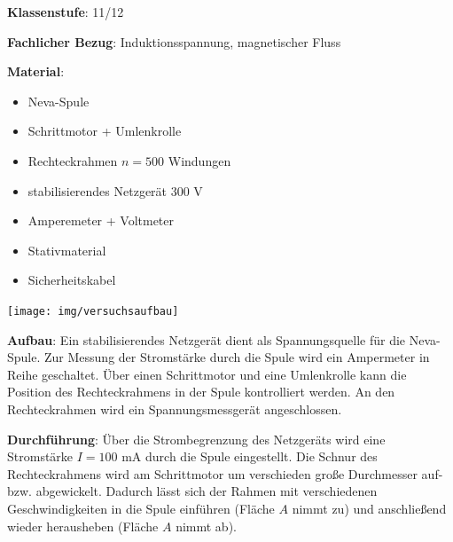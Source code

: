 \documentclass[../main.tex]{subfiles}
\begin{document}
\begin{tcolorbox}[
    width=\textwidth,
    height=\textheight,
    title=Versuch: Induktion bei Flächenänderung,
    fonttitle=\Large,
    before title=\vspace{0.2cm}, after title=\vspace{0.2cm},
    colback=white,
    title filled=true, 
    colbacktitle=mygray,
    colframe=black,
    coltitle=black,
    ]

    \vspace{0.2cm}
    \textbf{Klassenstufe}: 11/12

    \vspace{0.4cm}

    \textbf{Fachlicher Bezug}: Induktionsspannung, magnetischer Fluss
    \vspace{0.4cm}

    \begin{minipage}[c]{0.52\textwidth}
        \textbf{Material}:
        \vspace{-0.2cm}
        \begin{itemize}[noitemsep]
            \item Neva-Spule
            \item Schrittmotor + Umlenkrolle
            \item Rechteckrahmen $n=500$ Windungen
            \item stabilisierendes Netzgerät 300 V 
            \item Amperemeter + Voltmeter
            \item Stativmaterial
            \item Sicherheitskabel
        \end{itemize}
    \end{minipage}
    \hspace{0.3cm}
    \begin{minipage}[c]{0.48\textwidth}
        \centering
        \texttt{[image: img/versuchsaufbau]}
    \end{minipage}

    \vspace{0.5cm}
    \textbf{Aufbau}: Ein stabilisierendes Netzgerät dient als Spannungsquelle für die Neva-Spule. Zur Messung der Stromstärke durch die Spule wird ein Ampermeter in Reihe geschaltet. Über einen Schrittmotor und eine Umlenkrolle kann die Position des Rechteckrahmens in der Spule kontrolliert werden. An den Rechteckrahmen wird ein Spannungsmessgerät angeschlossen.  

    \vspace{0.4cm}
    \textbf{Durchführung}: Über die Strombegrenzung des Netzgeräts wird eine Stromstärke $I=100$ mA durch die Spule eingestellt. Die Schnur des Rechteckrahmens wird am Schrittmotor um verschieden große Durchmesser auf- bzw. abgewickelt. Dadurch lässt sich der Rahmen mit verschiedenen Geschwindigkeiten in die Spule einführen (Fläche $A$ nimmt zu) und anschließend wieder herausheben (Fläche $A$ nimmt ab).


\end{tcolorbox}
\end{document}
